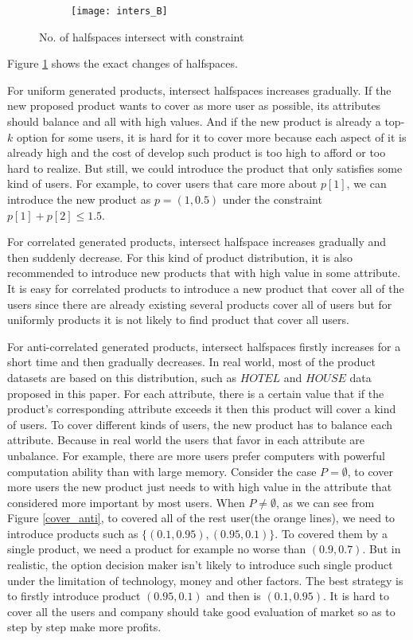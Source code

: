 \begin{figure}[hbt!]
  \centering
  \begin{subfigure}[b]{0.8\linewidth}
    \texttt{[image: inters\_B]}
  \end{subfigure}
  \caption{No. of halfspaces intersect with constraint}
  \label{inters_B}
\end{figure}

Figure \ref{inters_B} shows the exact changes of halfspaces. 

For uniform generated
products, intersect halfspaces increases gradually. If the new proposed product wants 
to cover as more user as possible, its attributes should balance and all with high
values. And if the new product is already a top-$k$ option for some users, it is 
hard for it to cover more because each aspect of it is already high and the cost of
develop such product is too high to afford or too hard to realize. But still, we
could introduce the product that only satisfies some kind of users. For example,
to cover users that care more about $p[1]$, we can introduce the new product as
$p=(1, 0.5)$ under the constraint $p[1]+p[2]\leq 1.5$. 

For correlated generated products,
intersect halfspace increases gradually and then suddenly decrease. For this kind of
product distribution, it is also recommended to introduce new products that with 
high value in some attribute. It is easy for correlated products to introduce a new product
that cover all of the users since there are already existing several products 
cover all of users but for uniformly products it is not likely to find product that 
cover all users.


For anti-correlated
generated products, intersect halfspaces firstly increases for a short time and then
gradually decreases. In real world, most of the product datasets are based on this 
distribution, such as $HOTEL$ and $HOUSE$ data proposed in this paper.  For each
attribute, there is a certain value that if the product's corresponding attribute
exceeds it then this product will cover a kind of users. To cover different kinds 
of users, the new product has to balance each attribute. Because in real world
the users that favor in each attribute are unbalance. For example, there are more 
users prefer
computers with powerful computation ability than with large memory. Consider the case
$P=\emptyset$, to cover more users the new product just needs to with high value
in the attribute that considered more important by most users. When $P\neq \emptyset$, 
as we can see from Figure \ref{cover_anti}, to covered all of the rest user(the orange lines), we need
to introduce products such as $\{(0.1, 0.95), (0.95, 0.1)\}$. To covered them by a single
product, we need a product for example no worse than $(0.9, 0.7)$. But in realistic, 
the option decision maker isn't likely to introduce such single product under the 
limitation of technology, money and other factors. The best strategy is to firstly 
introduce product $(0.95,0.1)$ and then is $(0.1, 0.95)$. It is hard to cover
all the users and company should take good evaluation of market so as to step by
step make more profits.


 
